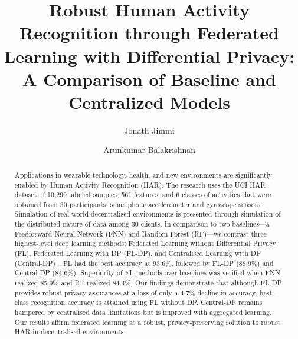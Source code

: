 
\title{Robust Human Activity Recognition through Federated Learning with Differential Privacy: A Comparison of Baseline and Centralized Models}

\author{Jonath Jimmi \and Arunkumar Balakrishnan}


\maketitle

\begin{abstract}
Applications in wearable technology, health, and new environments are significantly enabled by Human Activity Recognition (HAR). The research uses the UCI HAR dataset of 10,299 labeled samples, 561 features, and 6 classes of activities that were obtained from 30 participants' smartphone accelerometer and gyroscope sensors. Simulation of real-world decentralised environments is presented through simulation of the distributed nature of data among 30 clients. In comparison to two baselines—a Feedforward Neural Network (FNN) and Random Forest (RF)—we contrast three highest-level deep learning methods: Federated Learning without Differential Privacy (FL), Federated Learning with DP (FL-DP), and Centralised Learning with DP (Central-DP)~\cite{mcmahan2017communication}. FL had the best accuracy at 93.6\%, followed by FL-DP (88.9\%) and Central-DP (84.6\%). Superiority of FL methods over baselines was verified when FNN realized 85.9\% and RF realized 84.4\%. Our findings demonstrate that although FL-DP provides robust privacy assurances at a loss of only a \~4.7\% decline in accuracy, best-class recognition accuracy is attained using FL without DP. Central-DP remains hampered by centralised data limitations but is improved with aggregated learning. Our results affirm federated learning as a robust, privacy-preserving solution to robust HAR in decentralised environments.
\end{abstract}
